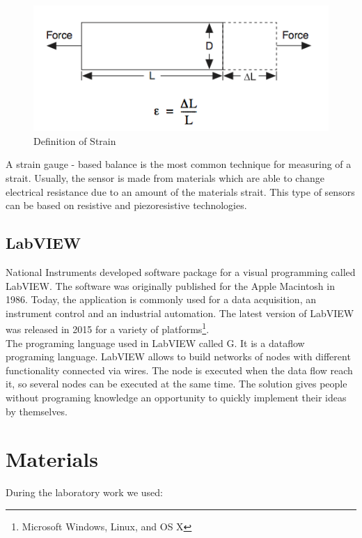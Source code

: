 \documentclass[english]{article}
\begin{document}
\begin{figure}[H]
\centerline{\includegraphics[scale=0.5]{labview/strait.png}}
\caption{Definition of Strain\cite{str}}
\end{figure}

A strain gauge - based balance is the most common technique for measuring of a strait. Usually, the sensor is made from materials which are able to change electrical resistance due to an amount of the materials strait. This type of sensors can be based on resistive and piezoresistive technologies.

\subsection{LabVIEW}

National Instruments developed software package for a visual programming called LabVIEW. The software was originally published for the Apple Macintosh in 1986. Today, the application is commonly used for a data acquisition, an instrument control and an industrial automation. The latest version of LabVIEW was released in 2015 for a variety of platforms\footnote{Microsoft Windows, Linux, and OS X}.\\

The programing language used in LabVIEW called G. It is a dataflow programing language. LabVIEW allows to build networks of nodes with different functionality connected via wires. The node is executed when the data flow reach it, so several nodes can be executed at the same time. The solution gives people without programing knowledge an opportunity to quickly implement their ideas by themselves.\cite{wiki}


\section{Materials}
During the laboratory work we used:
\end{document}
